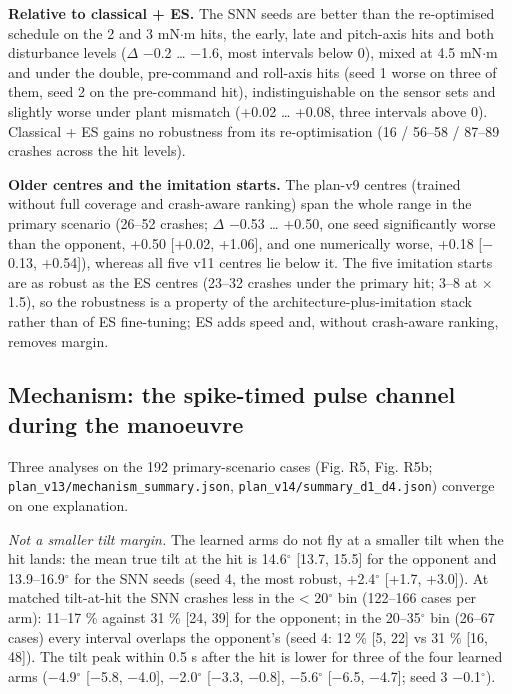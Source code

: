 \documentclass[10pt,a4paper]{article}
\begin{document}
\textbf{Relative to classical + ES.} The SNN seeds are better than the re-optimised schedule on the 2 and 3 mN$\cdot$m hits, the early, late and pitch-axis hits and both disturbance levels ($\Delta$ $-$0.2 \ldots{} $-$1.6, most intervals below 0), mixed at 4.5 mN$\cdot$m and under the double, pre-command and roll-axis hits (seed 1 worse on three of them, seed 2 on the pre-command hit), indistinguishable on the sensor sets and slightly worse under plant mismatch (+0.02 \ldots{} +0.08, three intervals above 0). Classical + ES gains no robustness from its re-optimisation (16 / 56--58 / 87--89 crashes across the hit levels).

\textbf{Older centres and the imitation starts.} The plan-v9 centres (trained without full coverage and crash-aware ranking) span the whole range in the primary scenario (26--52 crashes; $\Delta$ $-$0.53 \ldots{} +0.50, one seed significantly worse than the opponent, +0.50 [+0.02, +1.06], and one numerically worse, +0.18 [$-$0.13, +0.54]), whereas all five v11 centres lie below it. The five imitation starts are as robust as the ES centres (23--32 crashes under the primary hit; 3--8 at $\times$1.5), so the robustness is a property of the architecture-plus-imitation stack rather than of ES fine-tuning; ES adds speed and, without crash-aware ranking, removes margin.

\subsection{Mechanism: the spike-timed pulse channel during the manoeuvre}

Three analyses on the 192 primary-scenario cases (Fig. R5, Fig. R5b; \texttt{plan\_v13/mechanism\_summary.json}, \texttt{plan\_v14/summary\_d1\_d4.json}) converge on one explanation.

\emph{Not a smaller tilt margin.} The learned arms do not fly at a smaller tilt when the hit lands: the mean true tilt at the hit is 14.6$^\circ$ [13.7, 15.5] for the opponent and 13.9--16.9$^\circ$ for the SNN seeds (seed 4, the most robust, +2.4$^\circ$ [+1.7, +3.0]). At matched tilt-at-hit the SNN crashes less in the < 20$^\circ$ bin (122--166 cases per arm): 11--17 \% against 31 \% [24, 39] for the opponent; in the 20--35$^\circ$ bin (26--67 cases) every interval overlaps the opponent's (seed 4: 12 \% [5, 22] vs 31 \% [16, 48]). The tilt peak within 0.5 s after the hit is lower for three of the four learned arms ($-$4.9$^\circ$ [$-$5.8, $-$4.0], $-$2.0$^\circ$ [$-$3.3, $-$0.8], $-$5.6$^\circ$ [$-$6.5, $-$4.7]; seed 3 $-$0.1$^\circ$).
\end{document}
